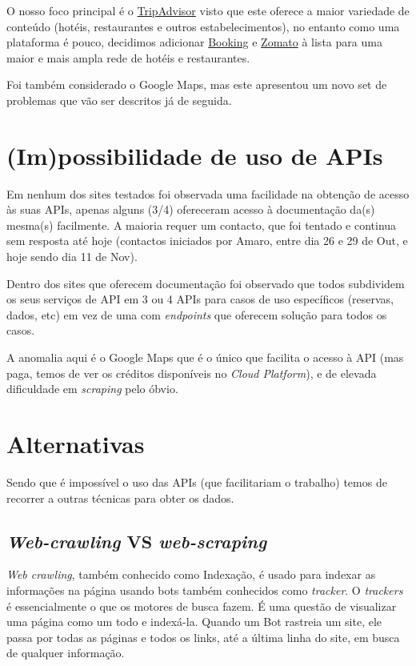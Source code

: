 \documentclass[a4paper,10pt]{article}
\begin{document}
O nosso foco principal é o \href{https://www.tripadvisor.com/}{TripAdvisor} visto que este oferece a maior variedade de conteúdo (hotéis, restaurantes e outros estabelecimentos), no entanto como uma plataforma é pouco, decidimos adicionar \href{https://www.booking.com/}{Booking} e \href{https://www.zomato.com/}{Zomato} à lista para uma maior e mais ampla rede de hotéis e restaurantes.

Foi também considerado o Google Maps, mas este apresentou um novo set de problemas que vão ser descritos já de seguida.

\section{(Im)possibilidade de uso de APIs}

Em nenhum dos sites testados foi observada uma facilidade na obtenção de acesso às suas APIs, apenas alguns (3/4) ofereceram acesso à documentação da(s) mesma(s) facilmente. A maioria requer um contacto, que foi tentado e continua sem resposta até hoje (contactos iniciados por Amaro, entre dia 26 e 29 de Out, e hoje sendo dia 11 de Nov).

Dentro dos sites que oferecem documentação foi observado que todos subdividem os seus serviços de API em 3 ou 4 APIs para casos de uso específicos (reservas, dados, etc) em vez de uma com \textit{endpoints} que oferecem solução para todos os casos.

A anomalia aqui é o Google Maps que é o único que facilita o acesso à API (mas paga, temos de ver os créditos disponíveis no \textit{Cloud Platform}), e de elevada dificuldade em \textit{scraping} pelo óbvio.

\section{Alternativas}

Sendo que é impossível o uso das APIs (que facilitariam o trabalho) temos de recorrer a outras técnicas para obter os dados.

\subsection{\textit{Web-crawling} VS \textit{web-scraping}}

\textit{Web crawling}, também conhecido como Indexação, é usado para indexar as informações na página usando bots também conhecidos como \textit{tracker}.
O \textit{trackers} é essencialmente o que os motores de busca fazem.
É uma questão de visualizar uma página como um todo e indexá-la.
Quando um Bot rastreia um site, ele passa por todas as páginas e todos os links, até a última linha do site, em busca de qualquer informação.
\end{document}
